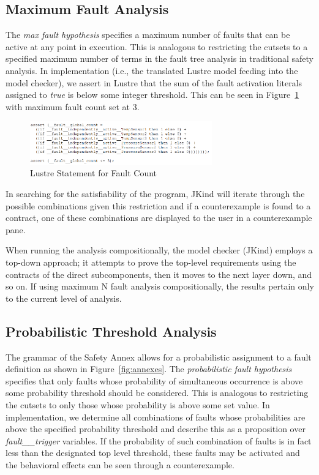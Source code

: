 \subsection{Maximum Fault Analysis}
The \textit{max fault hypothesis} specifies a maximum number of faults that can be active at any point in execution. This is analogous to restricting the cutsets to a specified maximum number of terms in the fault tree analysis in
traditional safety analysis. In implementation (i.e., the translated Lustre model feeding into the model checker), we assert in Lustre that the sum of the fault activation literals assigned to \textit{true} is below some integer threshold. This can be seen in Figure~\ref{fig:count} with maximum fault count set at 3.
\begin{figure}[h]
	\begin{center}
		\includegraphics[width=0.7\textwidth]{images/assertCount.PNG}
	\end{center}
	\caption{Lustre Statement for Fault Count}
	\label{fig:count}
\end{figure}
In searching for the satisfiability of the program, JKind will iterate through the possible combinations given this restriction and if a counterexample is found to a contract, one of these combinations are displayed to the user in a counterexample pane. 

When running the analysis compositionally, the model checker (JKind) employs a top-down approach; it attempts to prove the top-level requirements using the contracts of the direct subcomponents, then it moves to the next layer down, and so on. If using maximum N fault analysis compositionally, the results pertain only to the current level of analysis.


\subsection{Probabilistic Threshold Analysis}
The grammar of the Safety Annex allows for a probabilistic assignment to a fault definition as shown in Figure~\ref{fig:annexes}. The \textit{probabilistic fault hypothesis} specifies that only faults whose probability of simultaneous occurrence is above some probability threshold should be considered. This is analogous to restricting the cutsets to only those whose probability is above some set value. In implementation, we determine all combinations of faults whose probabilities are above the specified probability threshold and describe this as a proposition over {\em fault\_\_trigger} variables. If the probability of such combination of faults is in fact less than the designated top level threshold, these faults may be activated and the behavioral effects can be seen through a counterexample.  

